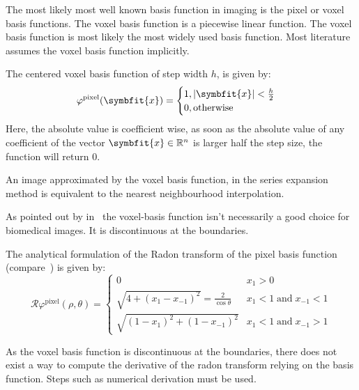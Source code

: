 The most likely most well known basis function in imaging is the pixel or voxel basis functions. The
voxel basis function is a piecewise linear function. The voxel basis function is most likely the
most widely used basis function. Most literature assumes the voxel basis function implicitly.

The centered voxel basis function of step width \(h\), is given by:
\begin{equation}\label{eq:voxel_basis_fn}
	\varphi^{\text{pixel}}(\symbfit{x}) =
	\begin{cases}
		1, \abs{\symbfit{x}} < \frac{h}{2} \\
		0, \text{otherwise}
	\end{cases}
\end{equation}
Here, the absolute value is coefficient wise, as soon as the absolute value of any coefficient of
the vector \(\symbfit{x} \in \mathbb{R}^n\) is larger half the step size, the function will return
\(0\).

An image approximated by the voxel basis function, in the series expansion method is equivalent to
the nearest neighbourhood interpolation.

As pointed out by \citeauthor*{lewitt_multidimensional_1990}
in~\cite{lewitt_multidimensional_1990,lewitt_alternatives_1992} the voxel-basis function isn't
necessarily a good choice for biomedical images. It is discontinuous at the boundaries.

The analytical formulation of the Radon transform of the pixel basis function
(compare~\cite{toft_radon_1996}) is given by:
\begin{equation}\label{eq:radon_voxel_basis}
	\mathscr{R}\varphi^{\text{pixel}}(\rho, \theta) =
	\begin{cases}
		0                                                  & x_1 > 0                         \\
		\sqrt{4 + (x_1 - x_{-1})^2} = \frac{2}{\cos\theta} & x_1 < 1\;\text{and}\;x_{-1} < 1 \\
		\sqrt{(1 - x_1)^2 + (1 - x_{-1})^2}                & x_1 < 1\;\text{and}\;x_{-1} > 1
	\end{cases}
\end{equation}

As the voxel basis function is discontinuous at the boundaries, there does not exist a way to
compute the derivative of the radon transform relying on the basis function. Steps such as numerical
derivation must be used.


